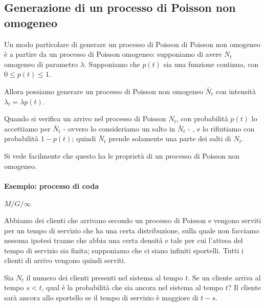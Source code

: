 \documentclass[a4paper,12pt]{book}
\begin{document}




\subsection{Generazione di un processo di Poisson non omogeneo}
Un modo particolare di generare un processo di Poisson di Poisson non omogeneo è a partire da un processo di Poisson omogeneo: supponiamo di avere $ N_t $ omogeneo di parametro $\lambda$. Supponiamo che $ p(t) $ sia una funzione continua, con $ 0 \le p(t) \le 1 $.

Allora possiamo generare un processo di Poisson non omogeneo $\bar{N}_t$ con intensità $\lambda_t = \lambda p(t)$. 

Quando si verifica un arrivo nel processo di Poisson $ N_t $, con probabilità $ p(t) $ lo accettiamo per $ \bar{N}_t $ - ovvero lo consideriamo un salto in $\bar{N}_t$ - , e lo rifiutiamo con probabilità $ 1 - p(t) $; quindi $ \bar{N}_t $ prende solamente una parte dei salti di $ N_t $.

Si vede facilmente che questo ha le proprietà di un processo di Poisson non omogeneo. 

\paragraph{Esempio: processo di coda } $ M/G/\infty $ 
	
Abbiamo dei clienti che arrivano secondo un processo di Poisson e vengono serviti per un tempo di servizio che ha una certa distribuzione, sulla quale non facciamo nessuna ipotesi tranne che abbia una certa densità e tale per cui l'attesa del tempo di servizio sia finita; supponiamo che ci siano infiniti sportelli. Tutti i clienti di arrivo vengono quindi serviti. 

Sia $ N_t $ il numero dei clienti presenti nel sistema al tempo $ t $. Se un cliente arriva al tempo $ s < t $, qual è la probabilità che sia ancora nel sistema al tempo $ t $? Il cliente sarà ancora allo sportello se il tempo di servizio è maggiore di $ t - s $. 
\end{document}
